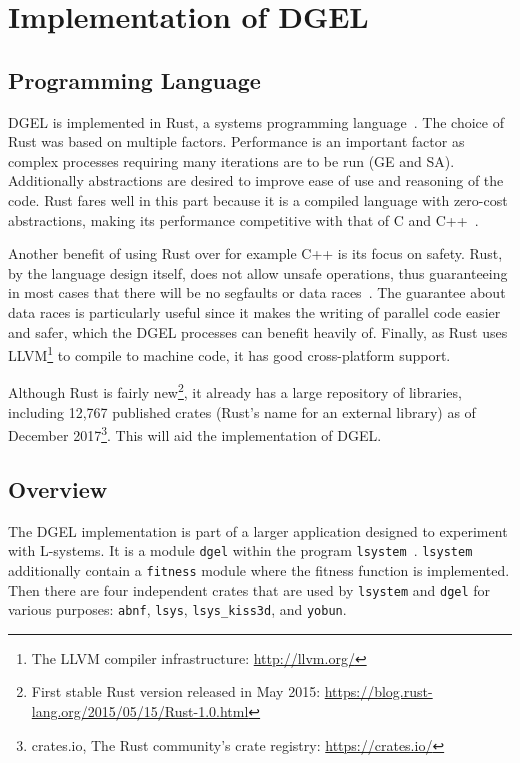 \chapter[Implementation of DGEL]{Implementation of \gls{DGEL}}
\section{Programming Language}
\gls{DGEL} is implemented in Rust, a systems programming language~\cite{Rust}.
The choice of Rust was based on multiple factors.
Performance is an important factor as complex processes requiring many iterations are to be run (\gls{GE} and \gls{SA}).
Additionally abstractions are desired to improve ease of use and reasoning of the code.
Rust fares well in this part because it is a compiled language with zero-cost abstractions, making its performance competitive with that of C and C++~\cite{RustFaq}.

Another benefit of using Rust over for example C++ is its focus on safety.
Rust, by the language design itself, does not allow unsafe operations, thus guaranteeing in most cases that there will be no segfaults or data races~\cite{RustSafe,Rust,RustRace}.
The guarantee about data races is particularly useful since it makes the writing of parallel code easier and safer, which the \gls{DGEL} processes can benefit heavily of.
Finally, as Rust uses LLVM\footnote{The LLVM compiler infrastructure: \url{http://llvm.org/}} to compile to machine code, it has good cross-platform support.

Although Rust is fairly new\footnote{First stable Rust version released in May 2015: \url{https://blog.rust-lang.org/2015/05/15/Rust-1.0.html}}, it already has a large repository of libraries, including 12,767 published crates (Rust's name for an external library) as of December 2017\footnote{crates.io, The Rust community’s crate registry: \url{https://crates.io/}}.
This will aid the implementation of \gls{DGEL}.

\section{Overview}
The \gls{DGEL} implementation is part of a larger application designed to experiment with \glspl{L-system}.
It is a module \texttt{dgel} within the program \texttt{lsystem}~\cite{CodeLsystem}.
\texttt{lsystem} additionally contain a \texttt{fitness} module where the fitness function is implemented.
Then there are four independent crates that are used by \texttt{lsystem} and \texttt{dgel} for various purposes: \texttt{abnf}, \texttt{lsys}, \texttt{lsys\_kiss3d}, and \texttt{yobun}.

